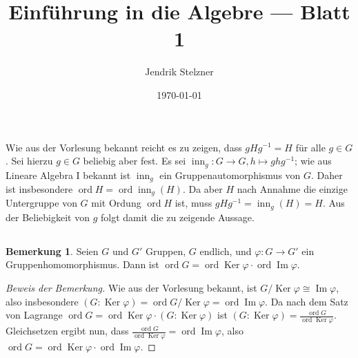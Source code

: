 \documentclass[a4paper,10pt]{article}
\title{Einführung in die Algebre — Blatt 1}
\author{Jendrik Stelzner}
\date{\today}
\theoremstyle{definition}
\newtheorem*{bem}{Bemerkung}
\newcommand{\ord}{\operatorname{ord}}
\newcommand{\inn}{\operatorname{inn}}
\newcommand{\Img}{\operatorname{Im}}
\newcommand{\Ker}{\operatorname{Ker}}
\begin{document}
\maketitle





\section{}





\section{}





\section{}


\subsection{}
Wie aus der Vorlesung bekannt reicht es zu zeigen, dass $gHg^{-1} = H$ für alle $g \in G$. Sei hierzu $g \in G$ beliebig aber fest. Es sei $\inn_g : G \rightarrow G, h \mapsto ghg^{-1}$; wie aus Lineare Algebra I bekannt ist $\inn_g$ ein Gruppenautomorphismus von $G$. Daher ist insbesondere $\ord H = \ord \inn_g(H)$. Da aber $H$ nach Annahme die einzige Untergruppe von $G$ mit Ordung $\ord H$ ist, muss $gHg^{-1} = \inn_g(H) = H$. Aus der Beliebigkeit von $g$ folgt damit die zu zeigende Aussage.


\subsection{}
\begin{bem}
 Seien $G$ und $G'$ Gruppen, $G$ endlich, und $\varphi : G \rightarrow G'$ ein Gruppenhomomorphismus. Dann ist $\ord G = \ord \Ker \varphi \cdot \ord \Img \varphi$.
\end{bem}
\begin{proof}[Beweis der Bemerkung]
 Wie aus der Vorlesung bekannt, ist $G/\Ker \varphi \cong \Img \varphi$, also insbesondere $(G : \Ker \varphi) = \ord G/\Ker \varphi = \ord \Img \varphi$. Da nach dem Satz von Lagrange $\ord G = \ord \Ker \varphi \cdot (G : \Ker \varphi)$ ist $(G : \Ker \varphi) = \frac{\ord G}{\ord \Ker \varphi}$. Gleichsetzen ergibt nun, dass $\frac{\ord G}{\ord \Ker \varphi} = \ord \Img \varphi$, also $\ord G = \ord \Ker \varphi \cdot \ord \Img \varphi$.
\end{proof}
\end{document}
